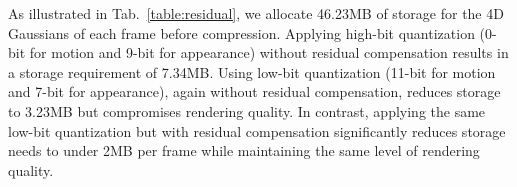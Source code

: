As illustrated in Tab.~\ref{table:residual}, we allocate 46.23MB of storage for the 4D Gaussians of each frame before compression. Applying high-bit quantization (0-bit for motion and 9-bit for appearance) without residual compensation results in a storage requirement of 7.34MB. Using low-bit quantization (11-bit for motion and 7-bit for appearance), again without residual compensation, reduces storage to 3.23MB but compromises rendering quality. In contrast, applying the same low-bit quantization but with residual compensation significantly reduces storage needs to under 2MB per frame while maintaining the same level of rendering quality.
\begin{table}[b]
    \Huge
	\begin{center}
		\centering
		\caption{Quantitative evaluation of residual compression methods.}
		\label{table:residual}
		\vspace{-20pt}
	\end{center}
\end{table}

